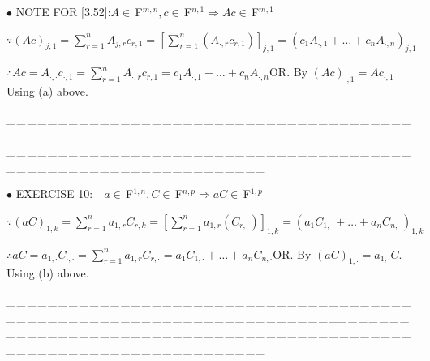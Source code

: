 \documentclass[a4paper, 11pt, UTF8]{article}
\def\Fbfc{$\,{\timesbf F}$}
\begin{document}
\begin{large}
{\small $\bullet$} {\timesbf\Large N{\normalsize OTE} F{\normalsize OR} [3.52]:}\quad $A\in\Fbfc^{m,n},c\in\Fbfc^{n,1}\Rightarrow Ac\in\Fbfc^{m,1}$\par\quad
$\because(Ac)_{j,1}=\sum\limits_{r=1}^n A_{j,r}c_{r,1}=[\sum\limits_{r=1}^n(A_{\cdot,r}c_{r,1})]_{j,1}=(c_1 A_{\cdot,1}+\dots+c_n A_{\cdot,n})_{j,1}$\par\quad
$\therefore Ac=A_{\cdot,\cdot}c_{\cdot,1}=\sum\limits_{r=1}^n A_{\cdot,r}c_{r,1}=c_1 A_{\cdot,1}+\dots+c_n A_{\cdot,n}$\quad O{\small R}. By $(Ac)_{\cdot,1}=Ac_{\cdot,1}$ Using (a) above.\par
{\tiny \_\,\_\,\_\,\_\,\_\,\_\,\_\,\_\,\_\,\_\,\_\,\_\,\_\,\_\,\_\,\_\,\_\,\_\,\_\,\_\,\_\,\_\,\_\,\_\,\_\,\_\,\_\,\_\,\_\,\_\,\_\,\_\,\_\,\_\,\_\,\_\,\_\,\_\,\_\,\_\,\_\,\_\,\_\,\_\,\_\,\_\,\_\,\_\,\_\,\_\,\_\,\_\,\_\,\_\,\_\,\_\,\_\,\_\,\_\,\_\,\_\,\_\,\_\,\_\,\_\,\_\,\_\,\_\,\_\,\_\,\_\_\,\_\,\_\,\_\,\_\,\_\,\_\,\_\,\_\,\_\,\_\,\_\,\_\,\_\,\_\,\_\,\_\,\_\,\_\,\_\,\_\,\_\,\_\,\_\,\_\,\_\,\_\,\_\,\_\,\_\,\_\,\_\,\_\,\_\,\_\,\_\,\_\,\_\,\_\,\_\,\_\,\_\,\_\,\_\,\_\,\_\,\_\,\_\,\_\,\_\,\_\,\_\,\_\,\_\,\_\,\_\,\_\,\_\,\_\,\_\,\_\,\_\,\_\,\_\,\_\,\_\,\_\,\_\,\_\,\_\,\_}\par
{\small $\bullet$} {\timesbf\Large E{\normalsize XERCISE} 10:}\qquad\,\,\,\, $a\in\Fbfc^{1,n},C\in\Fbfc^{n,p}\Rightarrow aC\in\Fbfc^{1,p}$\par\quad
$\because(aC)_{1,k}=\sum\limits_{r=1}^n a_{1,r}C_{r,k}=[\sum\limits_{r=1}^n a_{1,r}(C_{r,\cdot})]_{1,k}=(a_1 C_{1,\cdot}+\dots+a_n C_{n,\cdot})_{1,k}$\par\quad
$\therefore aC=a_{1,\cdot}C_{\cdot,\cdot}=\sum\limits_{r=1}^n a_{1,r}C_{r,\cdot}=a_1 C_{1,\cdot}+\dots+a_n C_{n,\cdot}$\quad O{\small R}. By $(aC)_{1,\cdot}=a_{1,\cdot}C$. Using (b) above.
\par
{\tiny \_\,\_\,\_\,\_\,\_\,\_\,\_\,\_\,\_\,\_\,\_\,\_\,\_\,\_\,\_\,\_\,\_\,\_\,\_\,\_\,\_\,\_\,\_\,\_\,\_\,\_\,\_\,\_\,\_\,\_\,\_\,\_\,\_\,\_\,\_\,\_\,\_\,\_\,\_\,\_\,\_\,\_\,\_\,\_\,\_\,\_\,\_\,\_\,\_\,\_\,\_\,\_\,\_\,\_\,\_\,\_\,\_\,\_\,\_\,\_\,\_\,\_\,\_\,\_\,\_\,\_\,\_\,\_\,\_\,\_\,\_\_\,\_\,\_\,\_\,\_\,\_\,\_\,\_\,\_\,\_\,\_\,\_\,\_\,\_\,\_\,\_\,\_\,\_\,\_\,\_\,\_\,\_\,\_\,\_\,\_\,\_\,\_\,\_\,\_\,\_\,\_\,\_\,\_\,\_\,\_\,\_\,\_\,\_\,\_\,\_\,\_\,\_\,\_\,\_\,\_\,\_\,\_\,\_\,\_\,\_\,\_\,\_\,\_\,\_\,\_\,\_\,\_\,\_\,\_\,\_\,\_\,\_\,\_\,\_\,\_\,\_\,\_\,\_\,\_\,\_\,\_}\par


\end{large}
\end{document}

